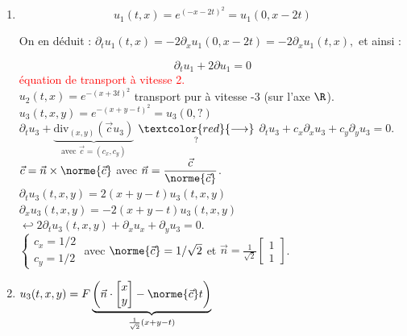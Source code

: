 \documentclass[12pt,a4paper]{article}
\begin{document}
	\begin{sol}$ $\\
		\begin{enumerate}
			\item 			
		\begin{equation}
			u_1(t,x) = e^{(-x-2t)^2} = u_1(0,x-2t)
		\end{equation}
		\begin{minipage}{16cm}
			On en déduit : $\partial_t u_1(t,x) = -2\partial_x u_1(0,x-2t) = -2\partial_x u_1(t,x),$ et ainsi :
		\end{minipage}
		\begin{equation}
			\partial_t u_1+2\partial u_1 = 0
		\end{equation}
		\textcolor{red}{équation de transport à vitesse 2.}\\
		
		$u_2(t,x) = e^{-(x+3t)^2}$ transport pur à vitesse -3 (sur l'axe $\R$).\\
		
		$u_3(t,x,y) = e^{-(x+y-t)^2} = u_3(0,?)$\\
		$\partial_t u_3 + \underbrace{\mathrm{div}_{(x,y)}(\vec c u_3)}_{\text{avec } \vec c = (c_x, c_y)}$ $  \underset{?}{\textcolor{red}{\longrightarrow}} $ $\partial_t u_3 + c_x\partial_xu_3 + c_y\partial_yu_3 = 0$.\\
		$\vec c = \vec n \times\norme{\vec c}$ avec $\vec n = \dfrac{\vec c}{\norme{\vec c}}$.\\
		$\partial_t u_3(t,x,y) = 2(x+y-t)u_3(t,x,y)$\\
		$\partial_xu_3(t,x,y)=-2(x+y-t)u_3(t,x,y)$\\
		$\hookleftarrow 2\partial_tu_3(t,x,y)+\partial_xu_x+\partial_yu_3 = 0$.\\
		$\begin{cases}
			c_x = 1/2\\
			c_y = 1/2
		\end{cases}$ avec $\norme{\vec c} = 1/\sqrt 2$ et $\vec n = \frac1{\sqrt{2}}\begin{bmatrix}
		1\\ 1
		\end{bmatrix}$.
		
		\item $u_3(t,x,y) = F\underbrace{\left(\vec n\cdot \begin{bmatrix}
			x\\ y
		\end{bmatrix}-\norme{\vec c}t\right)}_{\frac1{\sqrt 2}(x+y-t)}$\\
	

\end{enumerate}
\end{sol}
\end{document}
